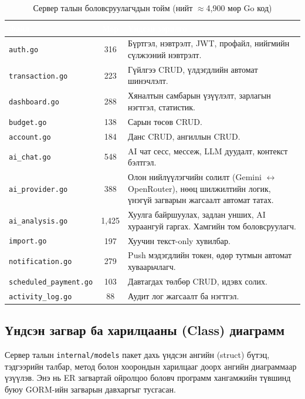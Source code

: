 \begin{table}[ht]
\centering
\footnotesize
\renewcommand{\arraystretch}{1.25}
\begin{tabular}{|p{3.5cm}|c|p{6.5cm}|}
\hline
\rowcolor{darknavy}
\textcolor{white}{\textbf{Файл}} & \textcolor{white}{\textbf{Мөр}} & \textcolor{white}{\textbf{Үндсэн зорилго}} \\ \hline
\texttt{auth.go}            & 316  & Бүртгэл, нэвтрэлт, JWT, профайл, нийгмийн сүлжээний нэвтрэлт. \\ \hline
\texttt{transaction.go}     & 223  & Гүйлгээ CRUD, үлдэгдлийн автомат шинэчлэлт. \\ \hline
\texttt{dashboard.go}       & 288  & Хяналтын самбарын үзүүлэлт, зарлагын нэгтгэл, статистик. \\ \hline
\texttt{budget.go}          & 138  & Сарын төсөв CRUD. \\ \hline
\texttt{account.go}         & 184  & Данс CRUD, ангиллын CRUD. \\ \hline
\texttt{ai\_chat.go}        & 548  & AI чат сесс, мессеж, LLM дуудалт, контекст бэлтгэл. \\ \hline
\texttt{ai\_provider.go}    & 388  & Олон нийлүүлэгчийн солилт (Gemini $\leftrightarrow$ OpenRouter), нөөц шилжилтийн логик, үнэгүй загварын жагсаалт автомат татах. \\ \hline
\texttt{ai\_analysis.go}    & 1{,}425 & Хуулга байршуулах, задлан унших, AI хураангуй гаргах. Хамгийн том боловсруулагч. \\ \hline
\texttt{import.go}          & 197  & Хуучин текст-only хувилбар. \\ \hline
\texttt{notification.go}    & 279  & Push мэдэгдлийн токен, өдөр тутмын автомат хуваарьчлагч. \\ \hline
\texttt{scheduled\_payment.go} & 103 & Давтагдах төлбөр CRUD, идэвх солих. \\ \hline
\texttt{activity\_log.go}   & 88   & Аудит лог жагсаалт ба нэгтгэл. \\ \hline
\end{tabular}
\caption{Сервер талын боловсруулагчдын тойм (нийт $\approx$4{,}900 мөр Go код)}
\label{tab:handlers}
\end{table}

\subsection{Үндсэн загвар ба харилцааны (Class) диаграмм}
Сервер талын \texttt{internal/models} пакет дахь үндсэн ангийн (struct) бүтэц, тэдгээрийн талбар, метод болон хоорондын харилцааг доорх ангийн диаграммаар үзүүлэв. Энэ нь ER загвартай ойролцоо боловч программ хангамжийн түвшинд буюу GORM-ийн загварын давхаргыг тусгасан.

